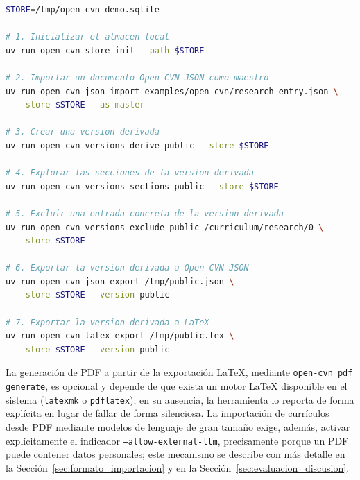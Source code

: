 \begin{code}[htbp]
\begin{lstlisting}[language=bash, basicstyle=\footnotesize\ttfamily, breaklines=true]
STORE=/tmp/open-cvn-demo.sqlite

# 1. Inicializar el almacen local
uv run open-cvn store init --path $STORE

# 2. Importar un documento Open CVN JSON como maestro
uv run open-cvn json import examples/open_cvn/research_entry.json \
  --store $STORE --as-master

# 3. Crear una version derivada
uv run open-cvn versions derive public --store $STORE

# 4. Explorar las secciones de la version derivada
uv run open-cvn versions sections public --store $STORE

# 5. Excluir una entrada concreta de la version derivada
uv run open-cvn versions exclude public /curriculum/research/0 \
  --store $STORE

# 6. Exportar la version derivada a Open CVN JSON
uv run open-cvn json export /tmp/public.json \
  --store $STORE --version public

# 7. Exportar la version derivada a LaTeX
uv run open-cvn latex export /tmp/public.tex \
  --store $STORE --version public
\end{lstlisting}
\caption{Recorrido completo de importación, versionado y exportación con la herramienta local.}
\label{cod:anexo_recorrido}
\end{code}

La generación de PDF a partir de la exportación LaTeX, mediante
\texttt{open-cvn pdf generate}, es opcional y depende de que exista un motor
LaTeX disponible en el sistema (\texttt{latexmk} o \texttt{pdflatex}); en su
ausencia, la herramienta lo reporta de forma explícita en lugar de fallar de
forma silenciosa. La importación de currículos desde PDF mediante modelos de
lenguaje de gran tamaño exige, además, activar explícitamente el indicador
\texttt{--allow-external-llm}, precisamente porque un PDF puede contener
datos personales; este mecanismo se describe con más detalle en la
Sección~\ref{sec:formato_importacion} y en la
Sección~\ref{sec:evaluacion_discusion}.
